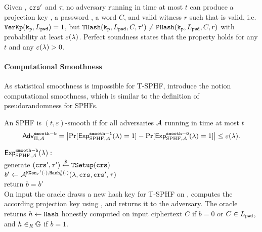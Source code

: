 \begin{definition}
Given \crs, $\mathtt{crs}'$ and $\tau$, no adversary running in time at most $t$ can produce a projection key \hp, a password \pwd, a word $C$, and valid witness $r$ such that \hp is valid, i.e. $\mathtt{VerKp}(\mathtt{k_p},L_\mathtt{pwd})=1$, but $\mathtt{THash}(\mathtt{k_p},L_\mathtt{pwd},C,\tau')\not=\mathtt{PHash}(\mathtt{k_p},L_\mathtt{pwd},C,r)$ with probability at least $\varepsilon(\lambda)$.
Perfect soundness states that the property holds for any $t$ and any $\varepsilon(\lambda)>0$.
\end{definition} 

\paragraph{Computational Smoothness}
As statistical smoothness is impossible for \ac{T-SPHF}, \citet{Benhamouda2013} introduce the notion computational smoothness, which is similar to the definition of pseudorandomness for \acp{SPHF}.

\begin{definition}
An \ac{SPHF} is $(t,\varepsilon)$-smooth if for all adversaries $\mathcal{A}$ running in time at most $t$
\[ \mathsf{Adv}_{\Pi, \mathcal{A}}^{\mathtt{smooth-b}} = \left|\Pr[\mathsf{Exp}^{\mathtt{smooth-1}}_{\text{SPHF},\mathcal{A}}(\lambda)=1] - \Pr[\mathsf{Exp}^{\mathtt{smooth-0}}_{\text{SPHF},\mathcal{A}}(\lambda)=1]\right| \leq \varepsilon(\lambda).\]

\noindent
$\mathsf{Exp}^{\mathtt{smooth-b}}_{\text{SPHF},\mathcal{A}}(\lambda):$ \\
\hspace*{2em} generate $(\mathtt{crs}',\tau')\stackrel{\$}{\gets}\mathtt{TSetup}(\mathtt{crs})$\\
\hspace*{2em} $b'\gets\mathcal{A}^{\mathtt{KGen_P}^1(\cdot), \mathtt{Hash}_b^1(\cdot)}(\lambda, \mathtt{crs}, \mathtt{crs}', \tau)$ \\
\hspace*{2em} return $b=b'$\\

\noindent
On input \pwd the \PKGen oracle draws a new hash key \hk for \ac{T-SPHF} on \Lpwd, computes the according projection key \hp using \PKGen, and returns it to the adversary.
The \Hash oracle returns $h\gets \mathtt{Hash}$ honestly computed on input ciphertext $C$ if $b=0$ or $C\in L_\mathtt{pwd}$, and $h\in_R \mathbb{G}$ if $b=1$.\\
\end{definition}



